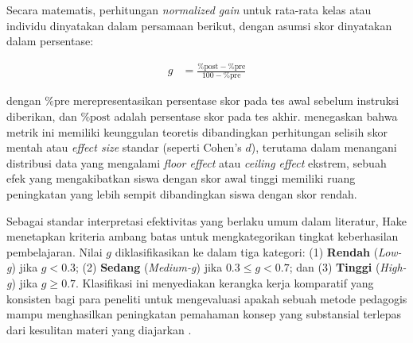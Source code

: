 Secara matematis, perhitungan \textit{normalized gain} untuk rata-rata kelas
atau individu dinyatakan dalam persamaan berikut, dengan asumsi skor dinyatakan
dalam persentase:

\begin{align}
    g &= \frac{\%\text{post} - \%\text{pre}}{100 - \%\text{pre}} \label{eq:normalized_gain_formula}
\end{align}

dengan $\%\text{pre}$ merepresentasikan persentase skor pada tes awal sebelum
instruksi diberikan, dan $\%\text{post}$ adalah persentase skor pada tes akhir.
\textcite{Coletta2020} menegaskan bahwa metrik ini memiliki keunggulan teoretis
dibandingkan perhitungan selisih skor mentah atau \textit{effect size} standar
(seperti Cohen's $d$), terutama dalam menangani distribusi data yang mengalami
\textit{floor effect} atau \textit{ceiling effect} ekstrem, sebuah efek yang
mengakibatkan siswa dengan
skor awal tinggi memiliki ruang peningkatan yang lebih sempit dibandingkan siswa
dengan skor rendah.

Sebagai standar interpretasi efektivitas yang berlaku umum dalam literatur, Hake
menetapkan kriteria ambang batas untuk mengkategorikan tingkat keberhasilan
pembelajaran. Nilai $g$ diklasifikasikan ke dalam tiga kategori: (1)
\textbf{Rendah} (\textit{Low-g}) jika $g < 0.3$; (2) \textbf{Sedang}
(\textit{Medium-g}) jika $0.3 \leq g < 0.7$; dan (3) \textbf{Tinggi}
(\textit{High-g}) jika $g \geq 0.7$. Klasifikasi ini menyediakan kerangka kerja
komparatif yang konsisten bagi para peneliti untuk mengevaluasi apakah sebuah
metode pedagogis mampu menghasilkan peningkatan pemahaman konsep yang substansial
terlepas dari kesulitan materi yang diajarkan \autocite{Coletta2020}.